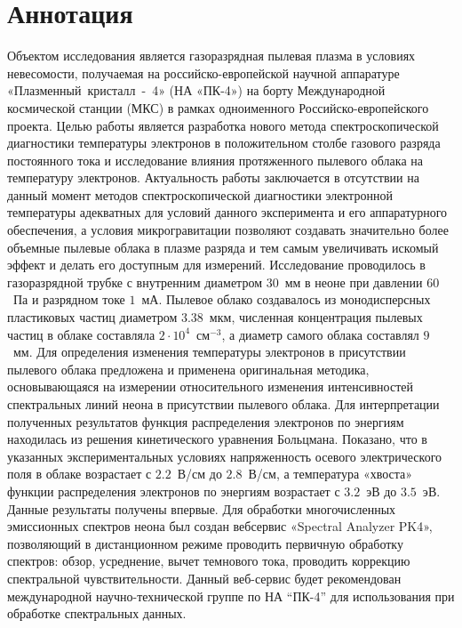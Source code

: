 \chapter*{Аннотация}

Объектом исследования является газоразрядная пылевая плазма в условиях невесомости,
получаемая на российско-европейской научной аппаратуре «Плазменный~кристалл~-~4»
(НА «ПК-4») на борту Международной космической станции (МКС) в рамках
одноименного Российско-европейского проекта. Целью работы является разработка
нового метода спектроскопической диагностики температуры электронов в
положительном столбе газового разряда постоянного тока и исследование влияния
протяженного пылевого облака на температуру электронов. Актуальность работы
заключается в отсутствии на данный момент методов спектроскопической диагностики
электронной температуры адекватных для условий данного эксперимента и его
аппаратурного обеспечения, а условия микрогравитации позволяют создавать значительно
более объемные пылевые облака в плазме разряда и тем самым увеличивать искомый
эффект и делать его доступным для измерений. Исследование проводилось в
газоразрядной трубке с внутренним диаметром $30$~мм в неоне при давлении $60$~Па и
разрядном токе $1$~мА. Пылевое облако создавалось из монодисперсных
пластиковых частиц диаметром $3.38$~мкм, численная концентрация пылевых частиц
в облаке составляла $2\cdot10^4$~см$^{-3}$, а диаметр самого облака составлял $9$~мм. Для
определения изменения температуры электронов в присутствии пылевого облака
предложена и применена оригинальная методика, основывающаяся на измерении
относительного изменения интенсивностей спектральных линий неона в
присутствии пылевого облака. Для интерпретации полученных результатов
функция распределения электронов по энергиям находилась из решения
кинетического уравнения Больцмана. Показано, что в указанных
экспериментальных условиях напряженность осевого электрического поля в облаке
возрастает с $2.2$~В/см до $2.8$~В/см, а температура «хвоста» функции распределения
электронов по энергиям возрастает с $3.2$~эВ до $3.5$~эВ. Данные результаты
получены впервые. Для обработки многочисленных эмиссионных спектров неона
был создан вебсервис «Spectral Analyzer PK4», позволяющий в дистанционном
режиме проводить первичную обработку спектров: обзор, усреднение, вычет
темнового тока, проводить коррекцию спектральной чувствительности. Данный
веб-сервис будет рекомендован международной научно-технической группе по НА
“ПК-4” для использования при обработке спектральных данных.

